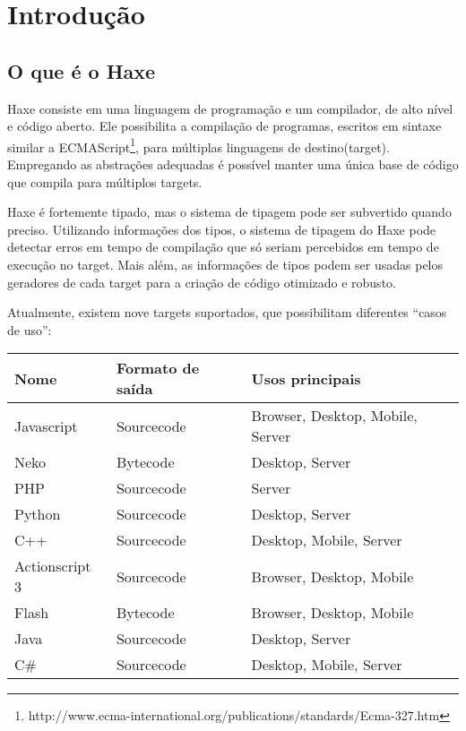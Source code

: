 \chapter{Introdução} %
\label{introduction} %

\section{O que é o Haxe}
\label{introduction-what-is-haxe}


Haxe consiste em uma linguagem de programação e um compilador, de alto nível e código aberto. Ele possibilita a compilação de programas, escritos em sintaxe similar a ECMAScript\footnote{http://www.ecma-international.org/publications/standards/Ecma-327.htm}, para múltiplas linguagens de destino(target). Empregando as abstrações adequadas é possível manter uma única base de código que compila para múltiplos targets.

Haxe é fortemente tipado, mas o sistema de tipagem pode ser subvertido quando preciso. Utilizando informações dos tipos, o sistema de tipagem do Haxe pode detectar erros em tempo de compilação que só seriam percebidos em tempo de execução no target. Mais além, as informações de tipos podem ser usadas pelos geradores de cada target para a criação de código otimizado e robusto.

Atualmente, existem nove targets suportados, que possibilitam diferentes ``casos de uso'':

\begin{center}
\begin{tabular}{| l | l | l |}
	\hline
	Nome & Formato de saída & Usos principais \\ \hline
	Javascript & Sourcecode & Browser, Desktop, Mobile, Server \\
	Neko & Bytecode & Desktop, Server \\
	PHP & Sourcecode & Server \\
	Python & Sourcecode & Desktop, Server \\
	C++ & Sourcecode & Desktop, Mobile, Server \\
	Actionscript 3 & Sourcecode & Browser, Desktop, Mobile \\
	Flash & Bytecode & Browser, Desktop, Mobile \\ 
	Java & Sourcecode & Desktop, Server \\
	C\# & Sourcecode & Desktop, Mobile, Server \\ \hline
\end{tabular}
\end{center}

